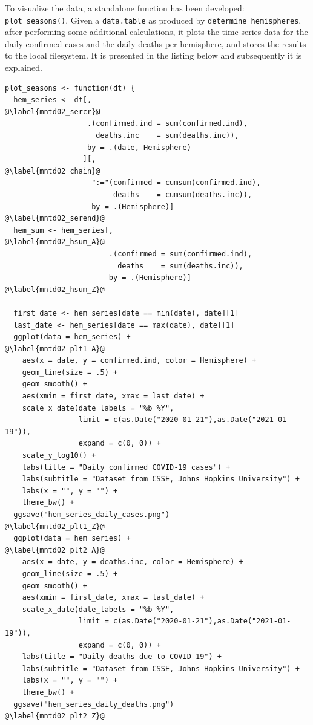 To visualize the data, a standalone function has been developed: \texttt{plot\_seasons()}.
Given a \texttt{data.table} as produced by \texttt{determine\_hemispheres}, after performing some additional calculations, it plots the time series data for the daily confirmed cases and the daily deaths per hemisphere, and stores the results to the local filesystem.
It is presented in the listing below and subsequently it is explained.

\begin{verbatim}
plot_seasons <- function(dt) {
  hem_series <- dt[,                                         @\label{mntd02_sercr}@
                   .(confirmed.ind = sum(confirmed.ind),
                     deaths.inc    = sum(deaths.inc)),
                   by = .(date, Hemisphere)
                  ][,                                        @\label{mntd02_chain}@
                    ":="(confirmed = cumsum(confirmed.ind),
                         deaths    = cumsum(deaths.inc)),
                    by = .(Hemisphere)]                      @\label{mntd02_serend}@
  hem_sum <- hem_series[,                                    @\label{mntd02_hsum_A}@
                        .(confirmed = sum(confirmed.ind),
                          deaths    = sum(deaths.inc)),
                        by = .(Hemisphere)]                  @\label{mntd02_hsum_Z}@

  first_date <- hem_series[date == min(date), date][1]
  last_date <- hem_series[date == max(date), date][1]
  ggplot(data = hem_series) +                                @\label{mntd02_plt1_A}@
    aes(x = date, y = confirmed.ind, color = Hemisphere) +
    geom_line(size = .5) +
    geom_smooth() +
    aes(xmin = first_date, xmax = last_date) +
    scale_x_date(date_labels = "%b %Y",
                 limit = c(as.Date("2020-01-21"),as.Date("2021-01-19")),
                 expand = c(0, 0)) +
    scale_y_log10() +
    labs(title = "Daily confirmed COVID-19 cases") +
    labs(subtitle = "Dataset from CSSE, Johns Hopkins University") +
    labs(x = "", y = "") +
    theme_bw() +
  ggsave("hem_series_daily_cases.png")                       @\label{mntd02_plt1_Z}@
  ggplot(data = hem_series) +                                @\label{mntd02_plt2_A}@
    aes(x = date, y = deaths.inc, color = Hemisphere) +
    geom_line(size = .5) +
    geom_smooth() +
    aes(xmin = first_date, xmax = last_date) +
    scale_x_date(date_labels = "%b %Y",
                 limit = c(as.Date("2020-01-21"),as.Date("2021-01-19")),
                 expand = c(0, 0)) +
    labs(title = "Daily deaths due to COVID-19") +
    labs(subtitle = "Dataset from CSSE, Johns Hopkins University") +
    labs(x = "", y = "") +
    theme_bw() +
  ggsave("hem_series_daily_deaths.png")                      @\label{mntd02_plt2_Z}@
\end{verbatim}

